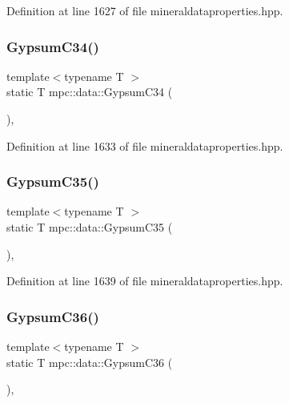 Definition at line 1627 of file mineraldataproperties.\+hpp.

\mbox{\label{namespacempc_1_1data_a8eadfdb2b7dc3da0be60b14eca00b9b4}} 
\subsubsection{\texorpdfstring{Gypsum\+C34()}{GypsumC34()}}
{\footnotesize\ttfamily template$<$typename T $>$ \\
static T mpc\+::data\+::\+Gypsum\+C34 (\begin{DoxyParamCaption}{ }\end{DoxyParamCaption})\hspace{0.3cm}{\ttfamily [inline]}, {\ttfamily [static]}}



Definition at line 1633 of file mineraldataproperties.\+hpp.

\mbox{\label{namespacempc_1_1data_a0de1028e7b7e79d8384d10acf211cf19}} 
\subsubsection{\texorpdfstring{Gypsum\+C35()}{GypsumC35()}}
{\footnotesize\ttfamily template$<$typename T $>$ \\
static T mpc\+::data\+::\+Gypsum\+C35 (\begin{DoxyParamCaption}{ }\end{DoxyParamCaption})\hspace{0.3cm}{\ttfamily [inline]}, {\ttfamily [static]}}



Definition at line 1639 of file mineraldataproperties.\+hpp.

\mbox{\label{namespacempc_1_1data_ae8689488432034a25c9db20f816c5416}} 
\subsubsection{\texorpdfstring{Gypsum\+C36()}{GypsumC36()}}
{\footnotesize\ttfamily template$<$typename T $>$ \\
static T mpc\+::data\+::\+Gypsum\+C36 (\begin{DoxyParamCaption}{ }\end{DoxyParamCaption})\hspace{0.3cm}{\ttfamily [inline]}, {\ttfamily [static]}}



